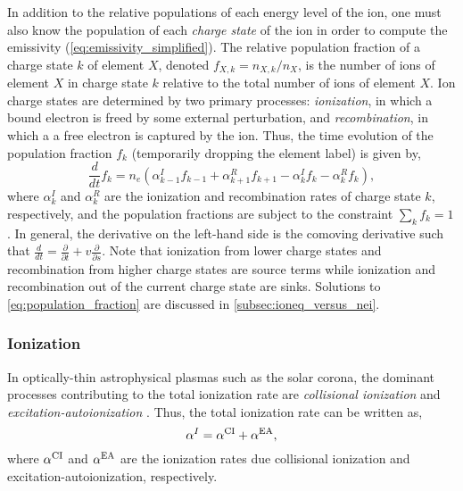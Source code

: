 In addition to the relative populations of each energy level of the ion, one must also know the population of each \textit{charge state} of the ion in order to compute the emissivity (\autoref{eq:emissivity_simplified}). The relative population fraction of a charge state $k$ of element $X$, denoted $f_{X,k}=n_{X,k}/n_X$, is the number of ions of element $X$ in charge state $k$ relative to the total number of ions of element $X$. Ion charge states are determined by two primary processes: \textit{ionization}, in which a bound electron is freed by some external perturbation, and \textit{recombination}, in which a a free electron is captured by the ion. Thus, the time evolution of the population fraction $f_k$ (temporarily dropping the element label) is given by,
\begin{equation}\label{eq:population_fraction}
    \frac{d}{dt}f_k = n_e(\alpha_{k-1}^I f_{k-1} + \alpha_{k+1}^R f_{k+1} - \alpha_{k}^I f_k - \alpha_k^R f_k),
\end{equation}
where $\alpha_k^I$ and $\alpha_k^R$ are the ionization and recombination rates of charge state $k$, respectively, and the population fractions are subject to the constraint $\sum_kf_k=1$ \citep{del_zanna_solar_2018}. In general, the derivative on the left-hand side is the comoving derivative such that $\frac{d}{dt}=\frac{\partial}{\partial t} + v\frac{\partial}{\partial s}$. Note that ionization from lower charge states and recombination from higher charge states are source terms while ionization and recombination out of the current charge state are sinks. Solutions to \autoref{eq:population_fraction} are discussed in \autoref{subsec:ioneq_versus_nei}.

\subsubsection{Ionization}

In optically-thin astrophysical plasmas such as the solar corona, the dominant processes contributing to the total ionization rate are \textit{collisional ionization} and \textit{excitation-autoionization} \citep{bradshaw_collisional_2013}. Thus, the total ionization rate can be written as,
\begin{equation}\label{eq:total_ionization_rate}
    \alpha^I = \alpha^\textup{CI} + \alpha^\textup{EA},
\end{equation}
where $\alpha^\textup{CI}$ and $\alpha^\textup{EA}$ are the ionization rates due collisional ionization and excitation-autoionization, respectively. 

